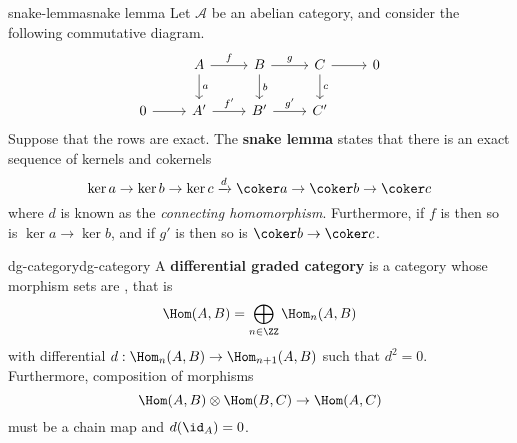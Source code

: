 \begin{topic}{snake-lemma}{snake lemma}
    Let $\mathcal{A}$ be an abelian category, and consider the following commutative diagram.
    \[ \begin{tikzcd} & A \arrow{d}{a} \arrow{r}{f} & B \arrow{d}{b} \arrow{r}{g} & C \arrow{d}{c} \arrow{r} & 0 \\ 0 \arrow{r} & A' \arrow{r}{f'} & B' \arrow{r}{g'} & C' \end{tikzcd} \]
    Suppose that the rows are exact. The \textbf{snake lemma} states that there is an exact sequence of kernels and cokernels
    \[ \ker a \rightarrow \ker b \rightarrow \ker c \xrightarrow{d} \coker a \rightarrow \coker b \rightarrow \coker c \]
    where $d$ is known as the \textit{connecting homomorphism}. Furthermore, if $f$ is  then so is $\ker a \to \ker b$, and if $g'$ is  then so is $\coker b \to \coker c$.
\end{topic}

\begin{topic}{dg-category}{dg-category}
    A \textbf{differential graded category} is a category whose morphism sets are , that is
    \[ \Hom(A, B) = \bigoplus_{n \in \ZZ} \Hom_n(A, B) \]
    with differential $d : \Hom_n(A, B) \to \Hom_{n + 1}(A, B)$ such that $d^2 = 0$. Furthermore, composition of morphisms
    \[ \Hom(A, B) \otimes \Hom(B, C) \to \Hom(A, C) \]
    must be a chain map and $d(\id_A) = 0$.
\end{topic}

